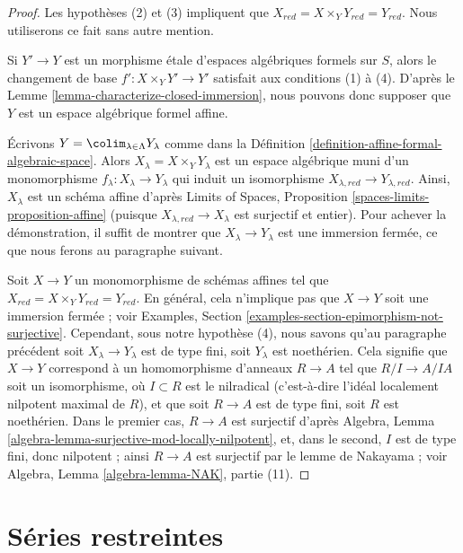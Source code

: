 \begin{proof}
Les hypothèses (2) et (3) impliquent que
$X_{red} = X \times_Y Y_{red} = Y_{red}$.
Nous utiliserons ce fait sans autre mention.

\medskip\noindent
Si $Y' \to Y$ est un morphisme étale d'espaces algébriques formels sur $S$,
alors le changement de base $f' : X \times_Y Y' \to Y'$ satisfait aux conditions
(1) à (4). D'après le Lemme \ref{lemma-characterize-closed-immersion},
nous pouvons donc supposer que $Y$ est un espace algébrique formel affine.

\medskip\noindent
Écrivons $Y = \colim_{\lambda \in \Lambda} Y_\lambda$ comme dans la
Définition \ref{definition-affine-formal-algebraic-space}.
Alors $X_\lambda = X \times_Y Y_\lambda$ est un espace algébrique
muni d'un monomorphisme $f_\lambda : X_\lambda \to Y_\lambda$
qui induit un isomorphisme $X_{\lambda, red} \to Y_{\lambda, red}$.
Ainsi, $X_\lambda$ est un schéma affine d'après
Limits of Spaces, Proposition \ref{spaces-limits-proposition-affine}
(puisque $X_{\lambda, red} \to X_\lambda$ est surjectif et entier).
Pour achever la démonstration, il suffit de montrer que
$X_\lambda \to Y_\lambda$ est une immersion fermée,
ce que nous ferons au paragraphe suivant.

\medskip\noindent
Soit $X \to Y$ un monomorphisme de schémas affines tel que
$X_{red} = X \times_Y Y_{red} = Y_{red}$. En général, cela
n'implique pas que $X \to Y$ soit une immersion fermée ; voir
Examples, Section \ref{examples-section-epimorphism-not-surjective}.
Cependant, sous notre hypothèse (4), nous savons qu'au paragraphe précédent
soit $X_\lambda \to Y_\lambda$ est de type fini, soit $Y_\lambda$
est noethérien. Cela signifie que
$X \to Y$ correspond à un homomorphisme d'anneaux $R \to A$ tel que
$R/I \to A/IA$ soit un isomorphisme, où $I \subset R$ est le
nilradical (c'est-à-dire l'idéal localement nilpotent maximal de $R$),
et que soit $R \to A$ est de type fini, soit $R$ est noethérien.
Dans le premier cas, $R \to A$ est surjectif d'après
Algebra, Lemma \ref{algebra-lemma-surjective-mod-locally-nilpotent},
et, dans le second, $I$ est de type fini, donc
nilpotent ; ainsi $R \to A$ est surjectif par le lemme de Nakayama ; voir
Algebra, Lemma \ref{algebra-lemma-NAK}, partie (11).
\end{proof}








\section{Séries restreintes}
\label{section-restricted-power-series}

